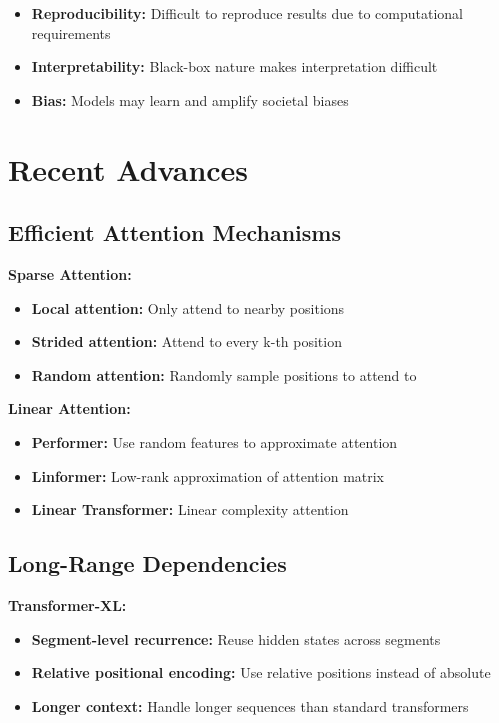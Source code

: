 \begin{itemize}
    \item \textbf{Reproducibility:} Difficult to reproduce results due to computational requirements
    \item \textbf{Interpretability:} Black-box nature makes interpretation difficult
    \item \textbf{Bias:} Models may learn and amplify societal biases
\end{itemize}

\section{Recent Advances}

\subsection{Efficient Attention Mechanisms}

\textbf{Sparse Attention:}
\begin{itemize}
    \item \textbf{Local attention:} Only attend to nearby positions
    \item \textbf{Strided attention:} Attend to every k-th position
    \item \textbf{Random attention:} Randomly sample positions to attend to
\end{itemize}

\textbf{Linear Attention:}
\begin{itemize}
    \item \textbf{Performer:} Use random features to approximate attention
    \item \textbf{Linformer:} Low-rank approximation of attention matrix
    \item \textbf{Linear Transformer:} Linear complexity attention
\end{itemize}

\subsection{Long-Range Dependencies}

\textbf{Transformer-XL:}
\begin{itemize}
    \item \textbf{Segment-level recurrence:} Reuse hidden states across segments
    \item \textbf{Relative positional encoding:} Use relative positions instead of absolute
    \item \textbf{Longer context:} Handle longer sequences than standard transformers
\end{itemize}

